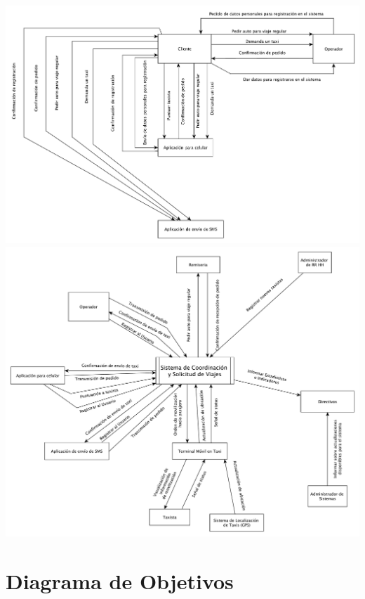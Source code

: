 \documentclass[a4paper]{article}
\begin{document}
\begin{center}
\includegraphics[scale=0.6,angle=90]{diagrama_contexto_1.pdf}
\includegraphics[scale=0.5]{diagrama_contexto_2.pdf}
\end{center}

\section{Diagrama de Objetivos}
\end{document}
